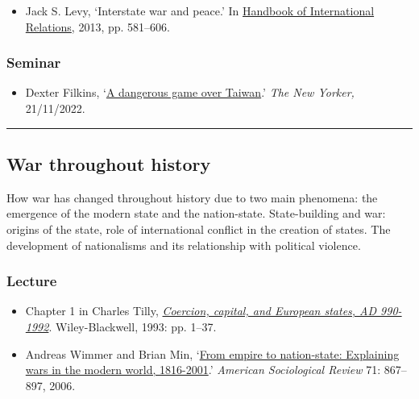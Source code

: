 \documentclass[12pt, a4paper]{article}
\begin{document}
\begin{itemize}
\setlength\itemsep{0pt}
\item Jack S. Levy, `Interstate war and peace.' In \href{https://uk.sagepub.com/en-gb/eur/handbook-of-international-relations/book234093}{Handbook of International Relations}, 2013, pp. 581--606.
\end{itemize}

\subsubsection*{Seminar}

\begin{itemize}
\setlength\itemsep{0pt}
\item Dexter Filkins, `\href{https://www.newyorker.com/magazine/2022/11/21/a-dangerous-game-over-taiwan}{A dangerous game over Taiwan}.' \textit{The New Yorker,} 21/11/2022.
\end{itemize}

\hrule %

\subsection{War throughout history}

How war has changed throughout history due to two main phenomena: the emergence of the modern state and the nation-state. State-building and war: origins of the state, role of international conflict in the creation of states. The development of nationalisms and its relationship with political violence.

\subsubsection*{Lecture}

\begin{itemize}
\setlength\itemsep{0pt}
\item Chapter 1 in Charles Tilly, \href{https://www.wiley.com/en-us/Coercion%2C+Capital+and+European+States%2C+A+D+990+1992-p-9781557863683}{\textit{Coercion, capital, and European states, AD 990-1992}}. Wiley-Blackwell, 1993: pp. 1--37.
\item Andreas Wimmer and Brian Min, `\href{https://doi.org/10.1177/000312240607100601}{From empire to nation-state: Explaining wars in the modern world, 1816-2001}.' \textit{American Sociological Review} 71: 867--897, 2006.
\end{itemize}
\end{document}
